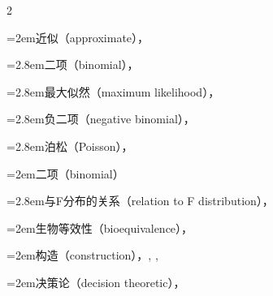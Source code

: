 \begin{multicols}{2}
\par\noindent\hangindent=2em\hspace*{1em}\label{idx:137}近似（approximate），\hyperref[ex:10.4.4]{\pageref*{ex:10.4.4}}\par
\par\noindent\hangindent=2.8em\hspace*{1.8em}\label{idx:138}二项（binomial），\hyperref[ex:10.4.1]{\pageref*{ex:10.4.1}}\par
\par\noindent\hangindent=2.8em\hspace*{1.8em}\label{idx:139}最大似然（maximum likelihood），\hyperref[eq:10.4.2]{\pageref*{eq:10.4.2}}\par
\par\noindent\hangindent=2.8em\hspace*{1.8em}\label{idx:140}负二项（negative binomial），\hyperref[ex:10.4.9]{\pageref*{ex:10.4.9}}\par
\par\noindent\hangindent=2.8em\hspace*{1.8em}\label{idx:141}泊松（Poisson），\hyperref[ex:10.4.5]{\pageref*{ex:10.4.5}}\par
{}
\par\noindent\hangindent=2em\hspace*{1em}\label{idx:142}二项（binomial）\par
\par\noindent\hangindent=2.8em\hspace*{1.8em}\label{idx:143}与F分布的关系（relation to F distribution），\hyperref[exercise:9.21]{\pageref*{exercise:9.21}}\par
\par\noindent\hangindent=2em\hspace*{1em}\label{idx:144}生物等效性（bioequivalence），\hyperref[exercise:9.33]{\pageref*{exercise:9.33}}\par
\par\noindent\hangindent=2em\hspace*{1em}\label{idx:145}构造（construction），\hyperref[ex:9.2.11]{\pageref*{ex:9.2.11}}, \hyperref[idxocc:145:381]{\pageref*{idxocc:145:381}}, \hyperref[exercise:9.17]{\pageref*{exercise:9.17}}\par
\par\noindent\hangindent=2em\hspace*{1em}\label{idx:146}决策论（decision theoretic），\hyperref[eq:9.3.4]{\pageref*{eq:9.3.4}}\par

\end{multicols}
